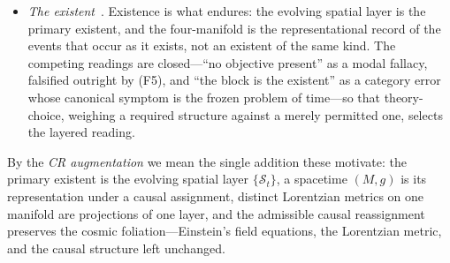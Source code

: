 \documentclass[11pt,a4paper]{article}
\theoremstyle{plain}
\theoremstyle{definition}
\theoremstyle{remark}
\begin{document}
\begin{itemize}
\item[(F6)] \emph{The existent}~\cite{JanzenShadowExistence,JanzenCanonicalTime}. Existence is what endures: the evolving spatial layer is the primary existent, and the four-manifold is the representational record of the events that occur as it exists, not an existent of the same kind. The competing readings are closed---``no objective present'' as a modal fallacy, falsified outright by (F5), and ``the block is the existent'' as a category error whose canonical symptom is the frozen problem of time---so that theory-choice, weighing a required structure against a merely permitted one, selects the layered reading.
\end{itemize}

By the \emph{CR augmentation} we mean the single addition these motivate: the primary existent is the evolving spatial layer $\{\mathcal{S}_t\}$, a spacetime $(M,g)$ is its representation under a causal assignment, distinct Lorentzian metrics on one manifold are projections of one layer, and the admissible causal reassignment preserves the cosmic foliation---Einstein's field equations, the Lorentzian metric, and the causal structure left unchanged.
\end{document}
